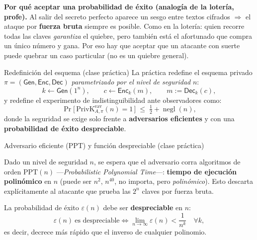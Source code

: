 \documentclass[11pt,a4paper]{article}
\newcommand{\Enc}{\mathsf{Enc}}
\newcommand{\Dec}{\mathsf{Dec}}
\newcommand{\Gen}{\mathsf{Gen}}
\DeclareMathOperator{\negl}{negl}
\begin{document}
\begin{slidebox}
\textbf{Por qué aceptar una probabilidad de éxito (analogía de la lotería, profe).} Al
salir del secreto perfecto aparece un sesgo entre textos cifrados $\Rightarrow$ el ataque
por \textbf{fuerza bruta} siempre es posible. Como en la lotería: quien recorre todas las
claves \emph{garantiza} el quiebre, pero también está el afortunado que compra un único
número y gana. Por eso hay que aceptar que un atacante con suerte puede quebrar un caso
particular (no es un quiebre general).
\end{slidebox}

\begin{practbox}{Redefinición del esquema (clase práctica)}
La práctica redefine el esquema privado $\pi=(\Gen,\Enc,\Dec)$ \emph{parametrizado por el
nivel de seguridad} $n$:
\[
  k\leftarrow\Gen(1^n),\qquad c\leftarrow\Enc_k(m),\qquad m:=\Dec_k(c),
\]
y redefine el experimento de indistinguibilidad ante observadores como:
\[
  \Pr\!\big[\,\mathrm{PrivK}^{\mathrm{eav}}_{A,\pi}(n)=1\,\big]\;\le\;\tfrac12+\negl(n),
\]
donde la seguridad se exige solo frente a \textbf{adversarios eficientes} y con una
\textbf{probabilidad de éxito despreciable}.
\end{practbox}

\begin{practbox}{Adversario eficiente (PPT) y función despreciable (clase práctica)}
\begin{description}[leftmargin=0pt,style=nextline,itemsep=4pt]
  \item[Adversario eficiente / PPT.] Dado un nivel de seguridad $n$, se espera que el
        adversario corra algoritmos de orden $\mathrm{PPT}(n)$ —\emph{Probabilistic
        Polynomial Time}—: \textbf{tiempo de ejecución polinómico} en $n$ (puede ser
        $n^2$, $n^{40}$, no importa, pero \emph{polinómico}). Esto descarta
        explícitamente al atacante que prueba las $2^n$ claves por fuerza bruta.
  \item[Función despreciable.] La probabilidad de éxito $\varepsilon(n)$ debe ser
        \textbf{despreciable} en $n$:
        \[
          \varepsilon(n)\ \text{es despreciable} \iff
          \lim_{n\to\infty}\varepsilon(n) < \frac{1}{n^k}\quad\forall k,
        \]
        es decir, decrece más rápido que el inverso de cualquier polinomio.
\end{description}
\end{practbox}
\end{document}
